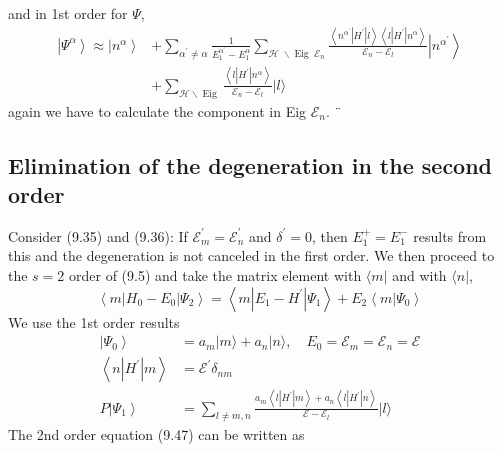 and in 1st order for $\Psi$,
\begin{equation}
\begin{aligned}\left|\Psi^{\alpha}\right\rangle \approx\left|n^{\alpha}\right\rangle &+\sum_{\alpha^{\prime} \neq \alpha} \frac{1}{E_{1}^{\alpha^{\prime}}-E_{1}^{\alpha}} \sum_{\mathcal{H} \;\backslash \operatorname{Eig} \;\mathcal{E}_{n}} \frac{\left\langle n^{\alpha^{\prime}}\left|H^{\prime}\right| l\right\rangle\left\langle l\left|H^{\prime}\right| n^{\alpha}\right\rangle}{\mathcal{E}_{n}-\mathcal{E}_{l}}\left|n^{\alpha^{\prime}}\right\rangle \\ &+\sum_{\mathcal{H} \backslash \operatorname{Eig}} \frac{\left\langle l\left|H^{\prime}\right| n^{\alpha}\right\rangle}{\mathcal{E}_{n}-\mathcal{E}_{l}}|l\rangle \end{aligned}
\end{equation}
again we have to calculate the component in Eig $\mathcal{E}_n$. ¨
\subsection{Elimination of the degeneration in the second order}
Consider (9.35) and (9.36): If $\mathcal{E}_{m}^{\prime}=\mathcal{E}_{n}^{\prime}$ and $\delta^{\prime}=0$, then $E^+_1 = E^−_1$ results from this and the degeneration is not canceled in the first order. We then proceed to the $s = 2$ order of (9.5) and take the matrix element with $\langle m |$ and with $\langle n |$,
\begin{equation}
    \left\langle m\left|H_{0}-E_{0}\right| \Psi_{2}\right\rangle=\left\langle m\left|E_{1}-H^{\prime}\right| \Psi_{1}\right\rangle+ E_{2}\left\langle m | \Psi_{0}\right\rangle
    \end{equation}
We use the 1st order results
\begin{align}
    \left|\Psi_{0}\right\rangle &= a_{m}|m\rangle+ a_{n}|n\rangle, \quad E_{0}=\mathcal{E}_{m}=\mathcal{E}_{n}=\mathcal{E} \nonumber\\
    \left\langle n\left|H^{\prime}\right| m\right\rangle &=\mathcal{E}^{\prime} \delta_{n m} \\
    P\left|\Psi_{1}\right\rangle &=\sum_{l \neq m, n} \frac{a_{m}\left\langle l\left|H^{\prime}\right| m\right\rangle+ a_{n}\left\langle l\left|H^{\prime}\right| n\right\rangle}{\mathcal{E}-\mathcal{E}_{l}}|l\rangle
\end{align}
The 2nd order equation (9.47) can be written as


